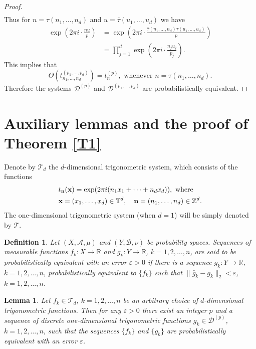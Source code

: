 \documentclass[12pt,reqno,fleqn]{amsart}
\theoremstyle{plain} %
\newtheorem{lemma}{Lemma}[section]
\theoremstyle{remark}
\def\x{\ensuremath{\textbf x}}
\def\n{\ensuremath{\textbf n}}
\def\ZB{\ensuremath{\mathscr B}}
\def\ZA{\ensuremath{\mathscr A}}
\def\ZZ{\ensuremath{\mathbb Z}}
\def\ZR{\ensuremath{\mathbb R}}
\def\ZD{\ensuremath{\mathscr D}}
\def\ZT{\ensuremath{\mathbb T}}
\def\zT{\ensuremath{\mathscr T}}
\theoremstyle{plain}
\newtheorem{definition}{Definition}[section]
\numberwithin{equation}{section}
\newcommand {\trm }[1]{Theorem \ref{#1}}
\begin{document}
\begin{proof}
\begin{align*}
\end{align*}
Thus for $n=\tau(n_1,\ldots,n_d)$ and $u=\bar \tau (u_1,\ldots,u_d)$ we have
\begin{align*}
	\exp\left(2\pi i\cdot  \frac{nu}{p}\right)&=\exp\left(2\pi i\cdot  \frac{\bar\tau(n_1,\ldots,n_d) \tau(u_1,\ldots,u_d)}{p}\right)\\
	&=\prod_{j=1}^d\exp\left(2\pi i\cdot  \frac{n_j u_j}{p_j}\right).
\end{align*}
This implies that 
\begin{equation*}
	\Theta(t_{n_1,\ldots,n_d}^{(p_1,\ldots,p_d)})=t^{(p)}_n,\text{ whenever } n=\tau(n_1,\ldots,n_d). 
\end{equation*}
Therefore the systems $\ZD^{(p)}$ and $\ZD^{(p_1,\ldots,p_d)}$ are probabilistically equivalent.
\end{proof}
\section{Auxiliary lemmas and the proof of \trm{T1}}
Denote by $\zT_d$ the $d$-dimensional  trigonometric system, which consists of the functions
\begin{align}
	&t_{\n}(\x)=\exp(2\pi i(n_1x_1+\cdots +n_dx_d)),\text{ where }\\
	&\x=(x_1,\ldots,x_d)\in \ZT^d,  \quad \n=(n_1,\ldots,n_d)\in \ZZ^d.
\end{align}
The one-dimensional trigonometric system (when $d=1$) will be simply denoted by $\zT$.
\begin{definition}
	Let $(X,\ZA,\mu)$ and $(Y,\ZB,\nu)$ be probability spaces. Sequences of measurable functions $f_k:X\to \ZR$ and $g_k:Y\to \ZR$, $k=1,2,\ldots,n$, are said to be probabilistically equivalent with an error $\varepsilon>0$ if there is a sequence $\bar g_k:Y\to \ZR$, $k=1,2,\ldots,n$, probabilistically equivalent to $\{f_k\}$ such that $\|\bar g_k-g_k\|_2<\varepsilon$, $k=1,2,\ldots,n$. 
\end{definition}
\begin{lemma}\label{L3}
Let $f_k\in\zT_d$, $k=1,2,\ldots,n$ be an arbitrary choice of $d$-dimensional trigonometric functions. Then for any $\varepsilon>0$ there exist an integer $p$ and a sequence of discrete one-dimensional trigonometric functions $g_k\in  \ZD^{(p)}$, $k=1,2,\ldots,n$,  such that the sequences $\{f_k\}$ and $\{g_k\}$ are probabilistically equivalent with an error $\varepsilon$.
\end{lemma}
\end{document}
